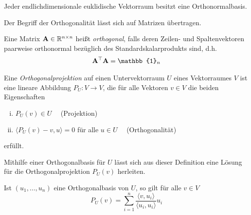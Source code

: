 
\begin{thm}
Jeder endlichdimensionale euklidische Vektorraum besitzt eine Orthonormalbasis.
\end{thm}

Der Begriff der Orthogonalität lässt sich auf Matrizen übertragen.

\begin{defn}
Eine Matrix $\mathbf{A} \in \mathbb{R}^{n \times n}$ heißt 		\textit{orthogonal}, falls deren Zeilen- und Spaltenvektoren paarweise orthonormal bezüglich des Standardskalarprodukts sind, d.h.
$$\mat A^{\top} \mat A = \mathbb{1}_n$$
\end{defn}

\begin{defn}
Eine \textit{Orthogonalprojektion} auf einen Untervektorraum $U$ eines Vektorraumes $V$ ist eine lineare Abbildung $P_U \colon V \rightarrow V$, die für alle Vektoren $v \in V$ die beiden Eigenschaften
\begin{enumerate}[(i)]
\item $P_U(v) \in U \quad$ (Projektion)
\item $\langle P_U(v) - v , u \rangle = 0$ für alle $u \in U \quad$ (Orthogonalität)
\end{enumerate}
erfüllt.
\end{defn}

Mithilfe einer Orthogonalbasis für $U$ lässt sich aus dieser Definition eine Lösung für die Orthogonalprojektion $P_U(v)$ herleiten.

\begin{thm}
\label{orthogonal_projection_theorem}
Ist $(u_1, \ldots, u_n)$ eine Orthogonalbasis von $U$, so gilt für alle $v \in V$
$$P_{U}(v) = \sum_{i=1}^n \frac{\langle v, u_i \rangle}{\langle u_i, u_i \rangle} u_i$$
\end{thm}

